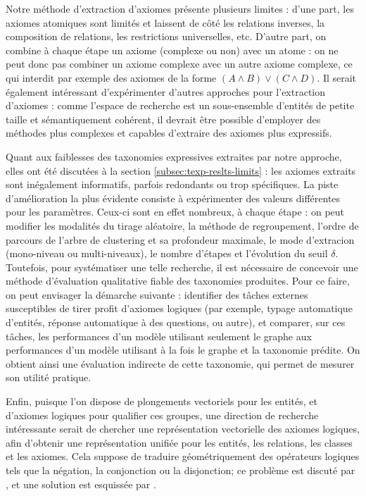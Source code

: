 Notre méthode d'extraction d'axiomes présente plusieurs limites : d'une part, les axiomes atomiques sont limités et laissent de côté les relations inverses, la composition de relations, les restrictions universelles, etc. D'autre part, on combine à chaque étape un axiome (complexe ou non) avec un atome : on ne peut donc pas combiner un axiome complexe avec un autre axiome complexe, ce qui interdit par exemple des axiomes de la forme $(A \land B) \lor (C \land D)$. Il serait également intéressant d'expérimenter d'autres approches pour l'extraction d'axiomes : comme l'espace de recherche est un sous-ensemble d'entités de petite taille et sémantiquement cohérent, il devrait être possible d'employer des méthodes plus complexes et capables d'extraire des axiomes plus expressifs.

Quant aux faiblesses des taxonomies expressives extraites par notre approche, elles ont été discutées à la section \ref{subsec:texp-reslts-limits} : les axiomes extraits sont inégalement informatifs, parfois redondants ou trop spécifiques. La piste d'amélioration la plus évidente consiste à expérimenter des valeurs différentes pour les paramètres. Ceux-ci sont en effet nombreux, à chaque étape : on peut modifier les modalités du tirage aléatoire, la méthode de regroupement, l'ordre de parcours de l'arbre de clustering et sa profondeur maximale, le mode d'extracion (mono-niveau ou multi-niveaux), le nombre d'étapes et l'évolution du seuil $\delta$. Toutefois, pour systématiser une telle recherche, il est nécessaire de concevoir une méthode d'évaluation qualitative fiable des taxonomies produites. Pour ce faire, on peut envisager la démarche suivante : identifier des tâches externes susceptibles de tirer profit d'axiomes logiques (par exemple, typage automatique d'entités, réponse automatique à des questions, ou autre), et comparer, sur ces tâches, les performances d'un modèle utilisant seulement le graphe aux performances d'un modèle utilisant à la fois le graphe et la taxonomie prédite. On obtient ainsi une évaluation indirecte de cette taxonomie, qui permet de mesurer son utilité pratique.



Enfin, puisque l'on dispose de plongements vectoriels pour les entités, et d'axiomes logiques pour qualifier ces groupes, une direction de recherche intéressante serait de chercher une représentation vectorielle des axiomes logiques, afin d'obtenir une représentation unifiée pour les entités, les relations, les classes et les axiomes. 
Cela suppose de traduire géométriquement des opérateurs logiques tels que la négation, la conjonction ou la disjonction; ce problème est discuté par
\cite{gutierrez2018knowledge}, et une solution est esquissée par \cite{hao2019universal}.
